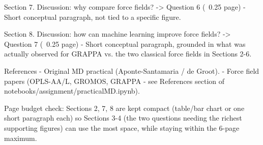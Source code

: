 Section 7. Discussion: why compare force fields? -> Question 6 (~0.25 page)
- Short conceptual paragraph, not tied to a specific figure.

Section 8. Discussion: how can machine learning improve force fields? -> Question 7 (~0.25 page)
- Short conceptual paragraph, grounded in what was actually observed for GRAPPA vs. the two
  classical force fields in Sections 2-6.

References
- Original MD practical (Aponte-Santamaria / de Groot).
- Force field papers (OPLS-AA/L, GROMOS, GRAPPA - see References section of
  notebooks/assignment/practicalMD.ipynb).

Page budget check: Sections 2, 7, 8 are kept compact (table/bar chart or one short paragraph
each) so Sections 3-4 (the two questions needing the richest supporting figures) can use the
most space, while staying within the 6-page maximum.
